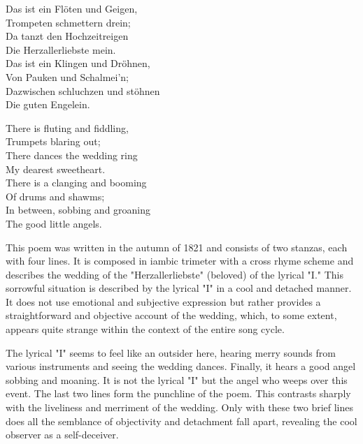 \documentclass[10pt,a4paper,twocolumn]{rho}
\begin{document}
\columnseprule=1pt 
\begin{multicols}{2}
\noindent Das ist ein Flöten und Geigen,\\
Trompeten schmettern drein;\\
Da tanzt den Hochzeitreigen\\
Die Herzallerliebste mein.\\
Das ist ein Klingen und Dröhnen,\\
Von Pauken und Schalmei’n;\\
Dazwischen schluchzen und stöhnen\\
Die guten Engelein.

\columnbreak

\noindent There is fluting and fiddling,\\
Trumpets blaring out;\\
There dances the wedding ring\\
My dearest sweetheart.\\
There is a clanging and booming\\
Of drums and shawms;\\
In between, sobbing and groaning\\
The good little angels.

\end{multicols}

This poem was written in the autumn of 1821 and consists of two stanzas, each with four lines. It is composed in iambic trimeter with a cross rhyme scheme and describes the wedding of the "Herzallerliebste" (beloved) of the lyrical "I." This sorrowful situation is described by the lyrical "I" in a cool and detached manner. It does not use emotional and subjective expression but rather provides a straightforward and objective account of the wedding, which, to some extent, appears quite strange within the context of the entire song cycle.

The lyrical "I" seems to feel like an outsider here, hearing merry sounds from various instruments and seeing the wedding dances. Finally, it hears a good angel sobbing and moaning. It is not the lyrical "I" but the angel who weeps over this event. The last two lines form the punchline of the poem. This contrasts sharply with the liveliness and merriment of the wedding. Only with these two brief lines does all the semblance of objectivity and detachment fall apart, revealing the cool observer as a self-deceiver.
\end{document}
